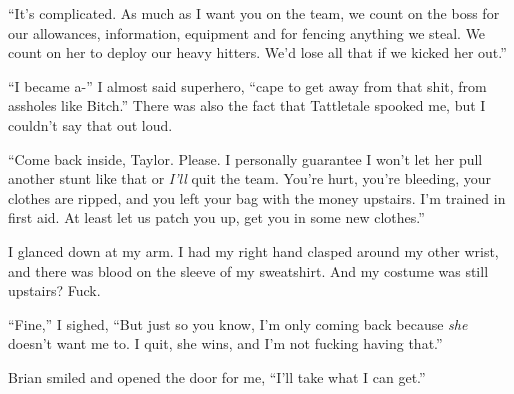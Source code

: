 ``It's complicated.  As much as I want you on the team, we count on the boss for our allowances, information, equipment and for fencing anything we steal.  We count on her to deploy our heavy hitters.  We'd lose all that if we kicked her out.''



``I became a-'' I almost said superhero, ``cape to get away from that shit, from assholes like Bitch.''  There was also the fact that Tattletale spooked me, but I couldn't say that out loud.



``Come back inside, Taylor.  Please.  I personally guarantee I won't let her pull another stunt like that or \emph{I'll} quit the team.  You're hurt, you're bleeding, your clothes are ripped, and you left your bag with the money upstairs.  I'm trained in first aid.  At least let us patch you up, get you in some new clothes.''



I glanced down at my arm.  I had my right hand clasped around my other wrist, and there was blood on the sleeve of my sweatshirt.  And my costume was still upstairs?  Fuck.



``Fine,'' I sighed, ``But just so you know, I'm only coming back because \emph{she} doesn't want me to.  I quit, she wins, and I'm not fucking having that.''



Brian smiled and opened the door for me, ``I'll take what I can get.''





